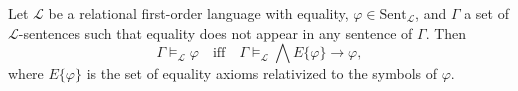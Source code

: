 Let $\mathcal{L}$ be a relational first-order language with equality, $\varphi \in \text{Sent}_{\mathcal{L}}$, and $\Gamma$ a set of $\mathcal{L}$-sentences such that equality does not appear in any sentence of $\Gamma$. Then
$$\Gamma \models_{\mathcal{L}} \varphi \quad \text{iff} \quad \Gamma \models_{\mathcal{L}} \bigwedge E\{\varphi\} \rightarrow \varphi,$$
where $E\{\varphi\}$ is the set of equality axioms relativized to the symbols of $\varphi$.
